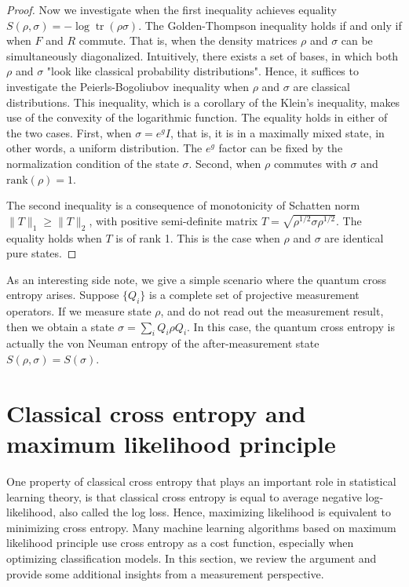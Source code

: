 \documentclass[11pt]{article}
\theoremstyle{definition}
\DeclareMathOperator{\tr}{\text{tr}}
\begin{document}
\begin{proof}
Now we investigate when the first inequality achieves equality $S(\rho,\sigma)=-\log\tr(\rho\sigma)$. The Golden-Thompson inequality holds if and only if when $F$ and $R$ commute. That is, when the density matrices $\rho$ and $\sigma$ can be simultaneously diagonalized. Intuitively, there exists a set of bases, in which both $\rho$ and $\sigma$ "look like classical probability distributions". Hence, it suffices to investigate the Peierls-Bogoliubov inequality when $\rho$ and $\sigma$ are classical distributions. This inequality, which is a corollary of the Klein's inequality, makes use of the convexity of the logarithmic function. The equality holds in either of the two cases. First, when $\sigma=e^g I$, that is, it is in a maximally mixed state, in other words, a uniform distribution. The $e^g$ factor can be fixed by the normalization condition of the state $\sigma$. Second, when $\rho$ commutes with $\sigma$ and $\text{rank}(\rho) = 1$.

The second inequality is a consequence of monotonicity of Schatten norm $\|T\|_1\geq \|T\|_2$, with positive semi-definite matrix $T = \sqrt{\rho^{1/2}\sigma\rho^{1/2}}$. The equality holds when $T$ is of rank 1. This is the case when $\rho$ and $\sigma$ are identical pure states.


\end{proof}


As an interesting side note, we give a simple scenario \cite{NielsenChuang} where the quantum cross entropy arises.
Suppose $\{Q_i\}$ is a complete set of projective measurement operators. If we measure state $\rho$, and do not read out the measurement result, then we obtain a state $\sigma = \sum_i Q_i \rho Q_i$. In this case, the quantum cross entropy is actually the von Neuman entropy of the after-measurement state $S(\rho, \sigma) = S(\sigma)$. 




\section{Classical cross entropy and maximum likelihood principle}\label{cce}

One property of classical cross entropy that plays an important role in statistical learning theory, is that classical cross entropy is equal to average negative log-likelihood, also called the log loss. Hence, maximizing likelihood is equivalent to minimizing cross entropy. Many machine learning algorithms based on maximum likelihood principle use cross entropy as a cost function, especially when optimizing classification models. In this section, we review the argument and provide some additional insights from a measurement perspective.
\end{document}
